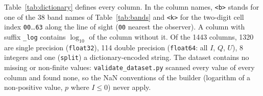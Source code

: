 Table~\ref{tab:dictionary} defines every column. In the column names, \texttt{<b>} stands for one of the 38 band
names of Table~\ref{tab:bands} and \texttt{<k>} for the two-digit cell index \texttt{00}\ldots\texttt{63} along
the line of sight (\texttt{00} nearest the observer). A column with suffix \texttt{\_log} contains $\log_{10}$ of the
column without it. Of the 1443 columns, 1320 are single precision (\texttt{float32}), 114 double precision
(\texttt{float64}: all $I$, $Q$, $U$), 8 integers and one (\texttt{split}) a dictionary-encoded string. The
dataset contains no missing or non-finite values: \texttt{validate\_dataset.py} scanned every value of every
column and found none, so the NaN conventions of the builder (logarithm of a non-positive value, $p$ where
$I\le0$) never apply.

\begingroup
\small
\setlength{\LTcapwidth}{\textwidth}

